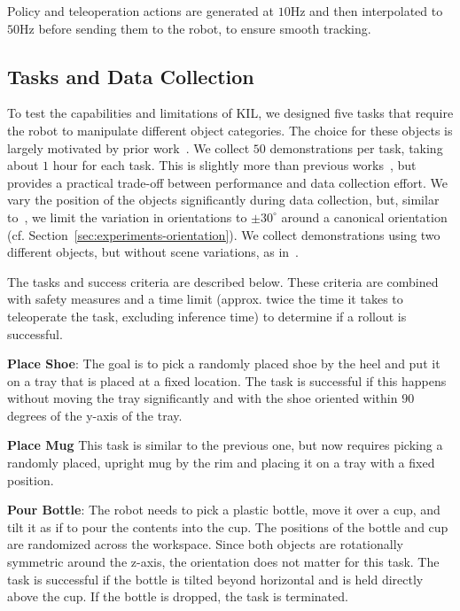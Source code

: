 \documentclass[letterpaper, 10 pt, conference]{ieeeconf}  %
\begin{document}
Policy and teleoperation actions are generated at $10$Hz and then interpolated to $50$Hz before sending them to the robot, to ensure smooth tracking. %

\subsection{Tasks and Data Collection}
\label{sec:experiments-tasks}
To test the capabilities and limitations of KIL, we designed five tasks that require the robot to manipulate different object categories. The choice for these objects is largely motivated by prior work~\cite{Levy2025P3PO,wang2025skil,di2024KAT,huang2025rekep}. 
We collect $50$ demonstrations per task, taking about $1$ hour for each task.  This is slightly more than previous works~\cite{Levy2025P3PO,di2024KAT,wang2025skil}, but provides a practical trade-off between performance and data collection effort. We vary the position of the objects significantly during data collection, but, similar to~\cite{wang2025skil,di2024KAT}, we limit the variation in orientations to \(\pm 30^\circ\) around a canonical orientation (cf. Section~\ref{sec:experiments-orientation}). We collect demonstrations using two different objects, but without scene variations, as in~\cite{Levy2025P3PO,wang2025skil,di2024KAT}.

The tasks and success criteria are described below. These criteria are combined with safety measures and a time limit (approx. twice the time it takes to teleoperate the task, excluding inference time) to determine if a rollout is successful.

\textbf{Place Shoe}: The goal is to pick a randomly placed shoe by the heel and put it on a tray that is placed at a fixed location. The task is successful if this happens without moving the tray significantly and with the shoe oriented within $90$ degrees of the y-axis of the tray.

\textbf{Place Mug} This task is similar to the previous one, but now requires picking a randomly placed, upright mug by the rim and placing it on a tray with a fixed position. 

\textbf{Pour Bottle}: The robot needs to pick a plastic 
bottle, move it over a cup, and tilt it as if to pour the contents into the cup.  The positions of the bottle and cup are randomized across the workspace. Since both objects are rotationally symmetric around the z-axis, the orientation does not matter for this task. The task is successful if the bottle is tilted beyond horizontal and is held directly above the cup. If the bottle is dropped, the task is terminated.
\end{document}
